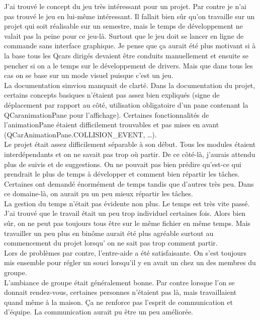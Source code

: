 \documentclass[a4paper, 12pt]{article}
\begin{document}
J'ai trouvé le concept du jeu très intéressant pour un projet. Par contre je n'ai pas trouvé le jeu en lui-même intéressant. Il fallait bien sûr qu'on travaille sur un projet qui soit réalisable sur un semestre, mais le temps de développement ne valait pas la peine pour ce jeu-là. Surtout que le jeu doit se lancer en ligne de commande sans interface graphique. Je pense que ça aurait été plus motivant si à la base tous les Qcars dirigés devaient être conduits manuellement et ensuite se pencher si on a le temps sur le développement de drivers. Mais que dans tous les cas on se base sur un mode visuel puisque c'est un jeu.\\
La documentation simviou manquait de clarté. Dans la documentation du projet, certains concepts basiques n'étaient pas assez bien expliqués (signe de déplacement par rapport au côté, utilisation obligatoire d'un pane contenant la QCaranimationPane pour l'affichage). Certaines fonctionnalités de l'animationPane étaient difficilement trouvables et pas mises en avant (QCarAnimationPane.COLLISION\_EVENT, …). \\
Le projet était assez difficilement séparable à son début. Tous les modules étaient interdépendants et on ne savait pas trop où partir. De ce côté-là, j'aurais attendu plus de suivis et de suggestions. On ne pouvait pas bien prédire qu'est-ce qui prendrait le plus de temps à développer et comment bien répartir les tâches. Certaines ont demandé énormément de temps tandis que d'autres très peu. Dans ce domaine-là, on aurait pu un peu mieux répartir les tâches. \\
La gestion du temps n'était pas évidente non plus. Le temps est très vite passé. \\
J'ai trouvé que le travail était un peu trop individuel certaines fois. Alors bien sûr, on ne peut pas toujours tous être sur le même fichier en même temps. Mais travailler un peu plus en binôme aurait été plus agréable surtout au commencement du projet lorsqu' on ne sait pas trop comment partir. \\
Lors de problèmes par contre, l'entre-aide a été satisfaisante. On s'est toujours mis ensemble pour régler un souci lorsqu'il y en avait un chez un des membres du groupe.\\
L'ambiance de groupe était généralement bonne. Par contre lorsque l'on se donnait rendez-vous, certaines personnes n'étaient pas là, mais travaillaient quand même à la maison. Ça ne renforce pas l'esprit de communication et d'équipe. La communication aurait pu être un peu améliorée.
\label{findudocument}
\end{document}

